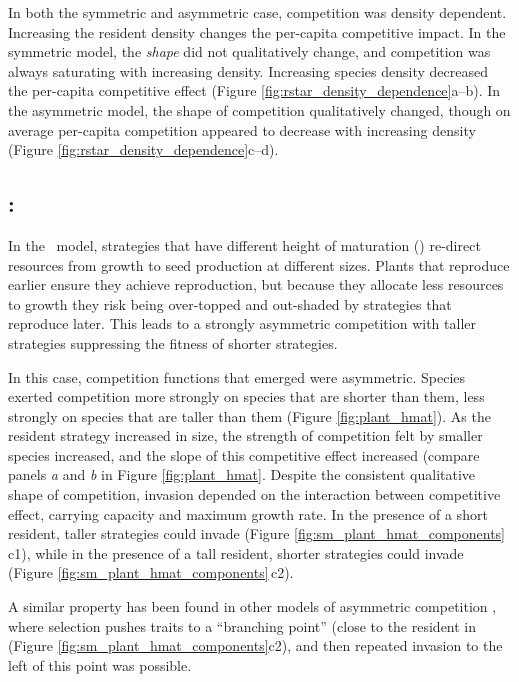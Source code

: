 \documentclass[a4paper,11pt]{article}
\begin{document}
In both the symmetric and asymmetric case, competition was density
dependent.  Increasing the resident density changes the per-capita
competitive impact.
%
In the symmetric model, the \emph{shape} did not qualitatively change,
and competition was always saturating with increasing density.
Increasing species density decreased the per-capita competitive effect
(Figure \ref{fig:rstar_density_dependence}a--b).
%
In the asymmetric model, the shape of competition qualitatively
changed, though on average per-capita competition appeared to decrease
with increasing density (Figure
\ref{fig:rstar_density_dependence}c--d).

\subsection{\plant: \hmat}

In the \plant\ model, strategies that have different height of
maturation (\hmat) re-direct resources from growth to seed production at
different sizes.  Plants that reproduce earlier ensure they achieve
reproduction, but because they allocate less resources to growth they
risk being over-topped and out-shaded by strategies that reproduce
later.  This leads to a strongly asymmetric competition with
taller strategies suppressing the fitness of shorter
strategies.

In this case, competition functions that emerged were
asymmetric. Species exerted competition more strongly on species that
are shorter than them, less strongly on species that are taller than
them (Figure \ref{fig:plant_hmat}).  As the resident strategy
increased in size, the strength of competition felt by smaller species
increased, and the slope of this competitive effect increased (compare
panels \textit{a} and \textit{b} in Figure \ref{fig:plant_hmat}.
%
Despite the consistent qualitative shape of competition, invasion
depended on the interaction between competitive effect, carrying
capacity and maximum growth rate. In the presence of a short resident,
taller strategies could invade (Figure
\ref{fig:sm_plant_hmat_components}\,c1), while in the presence of a
tall resident, shorter strategies could invade (Figure
\ref{fig:sm_plant_hmat_components}\,c2).

A similar property has been found in other models of asymmetric
competition \citep[e.g.,][]{Kisdi-1999}, where selection pushes traits
to a ``branching point'' (close to the resident in (Figure
\ref{fig:sm_plant_hmat_components}c2), and then repeated invasion to
the left of this point was possible.
\end{document}
